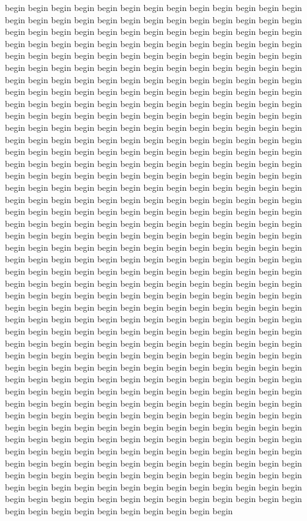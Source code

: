 begin begin begin begin begin begin begin begin begin begin begin begin begin begin begin begin begin begin begin begin begin begin begin begin begin begin begin begin begin begin begin begin begin begin begin begin begin begin begin begin begin begin begin begin begin begin begin begin begin begin begin begin begin begin begin begin begin begin begin begin begin begin begin begin begin begin begin begin begin begin begin begin begin begin begin begin begin begin begin begin begin begin begin begin begin begin begin begin begin begin begin begin begin begin begin begin begin begin begin begin begin begin begin begin begin begin begin begin begin begin begin begin begin begin begin begin begin begin begin begin begin begin begin begin begin begin begin begin begin begin begin begin begin begin begin begin begin begin begin begin begin begin begin begin begin begin begin begin begin begin begin begin begin begin begin begin begin begin begin begin begin begin begin begin begin begin begin begin begin begin begin begin begin begin begin begin begin begin begin begin begin begin begin begin begin begin begin begin begin begin begin begin begin begin begin begin begin begin begin begin begin begin begin begin begin begin begin begin begin begin begin begin begin begin begin begin begin begin begin begin begin begin begin begin begin begin begin begin begin begin begin begin begin begin begin begin begin begin begin begin begin begin begin begin begin begin begin begin begin begin begin begin begin begin begin begin begin begin begin begin begin begin begin begin begin begin begin begin begin begin begin begin begin begin begin begin begin begin begin begin begin begin begin begin begin begin begin begin begin begin begin begin begin begin begin begin begin begin begin begin begin begin begin begin begin begin begin begin begin begin begin begin begin begin begin begin begin begin begin begin begin begin begin begin begin begin begin begin begin begin begin begin begin begin begin begin begin begin begin begin begin begin begin begin begin begin begin begin begin begin begin begin begin begin begin begin begin begin begin begin begin begin begin begin begin begin begin begin begin begin begin begin begin begin begin begin begin begin begin begin begin begin begin begin begin begin begin begin begin begin begin begin begin begin begin begin begin begin begin begin begin begin begin begin begin begin begin begin begin begin begin begin begin begin begin begin begin begin begin begin begin begin begin begin begin begin begin begin begin begin begin begin begin begin begin begin begin begin begin begin begin begin begin begin begin begin begin begin begin begin begin begin begin begin begin begin begin begin begin begin begin begin begin begin begin begin begin begin begin begin begin begin begin begin begin begin begin begin begin begin begin begin begin begin begin begin begin begin begin begin begin begin begin begin begin begin begin begin begin begin begin begin begin begin begin begin begin begin begin begin begin begin begin begin begin begin begin begin begin begin begin begin begin begin begin begin begin begin begin begin begin begin begin begin begin begin begin begin begin begin begin begin begin begin begin begin begin begin begin begin begin begin begin begin begin begin 